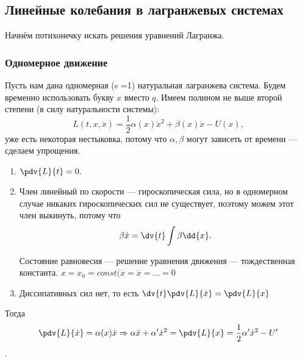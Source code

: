 \subsection{Линейные колебания в лагранжевых системах}
Начнём потихонечку искать решения уравнений Лагранжа.
\subsubsection{Одномерное движение}
Пусть нам дана одномерная (s =1) натуральная лагранжева система. Будем временно использовать букву $x $ вместо $q$. Имеем полином не выше второй степени (в силу натуральности системы):
\[L(t, x, \dot{x})  = \frac{1}{2} \alpha(x) \dot{x}^2 + \beta(x) \dot{x} - U(x),\]
уже есть некоторая нестыковка, потому что $\alpha, \beta$ могут зависеть от времени --- сделаем упрощения.
\begin{enumerate}
\item $\pdv{L}{t} = 0.$
\item Член линейный по скорости --- гироскопическая сила, но в одномерном случае никаких гироскопических сил не существует, поэтому можем этот член выкинуть, потому что
\[\beta \dot{x} = \dv{t} \int \beta \dd{x}.\]
\begin{dfn}
Состояние равновесия --- решение уравнения движения --- тождественная константа.
$x = x_0 = const (\dot{x} = \ddot{x} = \dots = 0$
\end{dfn}
\item Диссипативных сил нет, то есть $\dv{t} \pdv{L}{\dot{x}} = \pdv{L}{x}$
\end{enumerate}
Тогда 
\[\pdv{L}{\dot{x}} = \alpha(x) \dot{x} \Rightarrow \alpha \ddot{x} + \alpha' \dot{x}^2 = \pdv{L}{x} = \frac{1}{2} \alpha' \dot{x}^2 - U' \].
